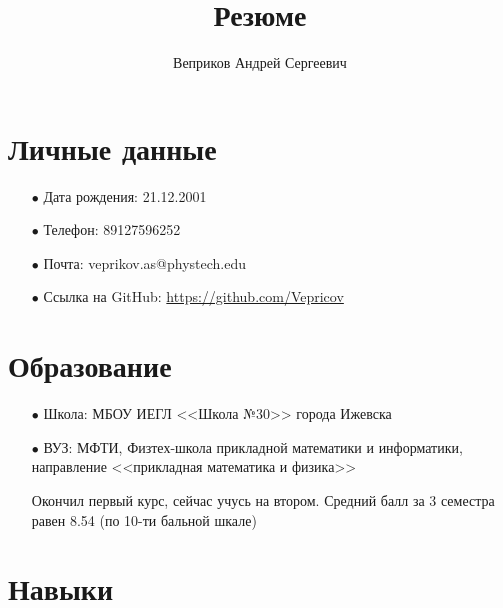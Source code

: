 \documentclass[a4paper,12pt]{article} %
\author{Веприков Андрей Сергеевич}
\title{Резюме}
\begin{document}

\maketitle

\section*{Личные данные}

\begin{enumerate}

\item[$\bullet$] Дата рождения: 21.12.2001

\item[$\bullet$] Телефон: 89127596252

\item[$\bullet$] Почта: veprikov.as@phystech.edu

\item[$\bullet$] Ссылка на GitHub: \url{https://github.com/Vepricov} 

\end{enumerate}

\section*{Образование}

\begin{enumerate}

\item[$\bullet$] Школа: МБОУ ИЕГЛ <<Школа №30>> города Ижевска

\item[$\bullet$] ВУЗ: МФТИ, Физтех-школа прикладной математики и информатики, направление <<прикладная математика и физика>>

Окончил первый курс, сейчас учусь на втором. Средний балл за 3 семестра равен 8.54 (по 10-ти бальной шкале)

\end{enumerate}

\section*{Навыки}
\end{document}
